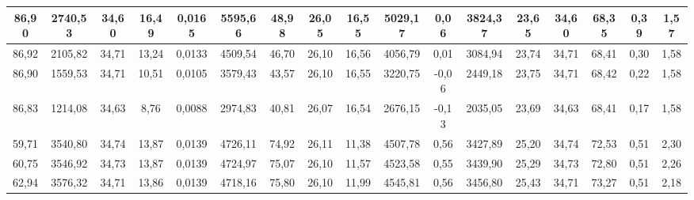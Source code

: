 \begin{table}[H]
{\begin{tabular}{|c|c|c|c|c|c|c|c|c|c|c|c|c|c|c|c|c|}
86,90                     & 2740,53           & 34,60          & 16,49             & 0,0165            & 5595,66           & 48,98                & 26,05             & 16,55            & 5029,17          & 0,06           & 3824,37            & 23,65          & 34,60            & 68,35                  & 0,39               & 1,57          \\ \hline
86,92                     & 2105,82           & 34,71          & 13,24             & 0,0133            & 4509,54           & 46,70                & 26,10             & 16,56            & 4056,79          & 0,01           & 3084,94            & 23,74          & 34,71            & 68,41                  & 0,30               & 1,58          \\ \hline
86,90                     & 1559,53           & 34,71          & 10,51             & 0,0105            & 3579,43           & 43,57                & 26,10             & 16,55            & 3220,75          & -0,06          & 2449,18            & 23,75          & 34,71            & 68,42                  & 0,22               & 1,58          \\ \hline
86,83                     & 1214,08           & 34,63          & 8,76              & 0,0088            & 2974,83           & 40,81                & 26,07             & 16,54            & 2676,15          & -0,13          & 2035,05            & 23,69          & 34,63            & 68,41                  & 0,17               & 1,58          \\ \hline
\rowcolor[HTML]{C0E6F5} 
59,71                     & 3540,80           & 34,74          & 13,87             & 0,0139            & 4726,11           & 74,92                & 26,11             & 11,38            & 4507,78          & 0,56           & 3427,89            & 25,20          & 34,74            & 72,53                  & 0,51               & 2,30          \\ \hline
60,75                     & 3546,92           & 34,73          & 13,87             & 0,0139            & 4724,97           & 75,07                & 26,10             & 11,57            & 4523,58          & 0,55           & 3439,90            & 25,29          & 34,73            & 72,80                  & 0,51               & 2,26          \\ \hline
62,94                     & 3576,32           & 34,71          & 13,86             & 0,0139            & 4718,16           & 75,80                & 26,10             & 11,99            & 4545,81          & 0,56           & 3456,80            & 25,43          & 34,71            & 73,27                  & 0,51               & 2,18          \\ \hline

\end{tabular}}
\end{table}
